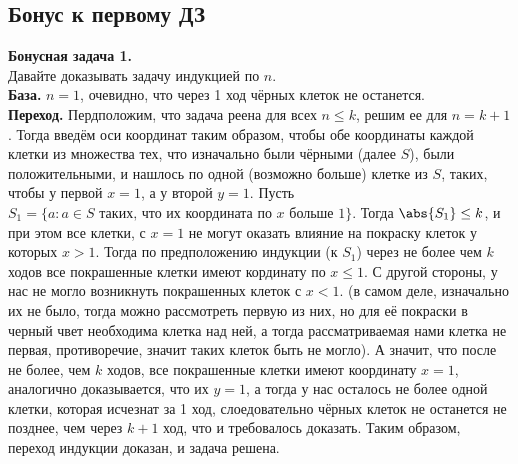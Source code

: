 \subsection{Бонус к первому ДЗ}


\textbf{Бонусная задача 1.}\\
Давайте доказывать задачу индукцией по $n$.\\
\textbf{База.} $n=1$, очевидно, что через 1 ход чёрных клеток не останется.\\
\textbf{Переход.} Пердположим, что задача реена для всех $n \leq k$, решим ее для $n=k+1$. Тогда введём оси координат таким образом, чтобы обе координаты каждой клетки из множества тех, что изначально были чёрными (далее $S$), были положительными, и нашлось по одной (возможно больше) клетке из $S$, таких, чтобы у первой $x=1$, а у второй $y=1$. Пусть $S_1 = \{a: a \in S \text{ таких, что их координата по $x$ больше 1}\}$. Тогда $\abs{S_1} \leq k$, и при этом все клетки, с $x = 1$ не могут оказать влияние на покраску клеток у которых $x > 1$. Тогда по предположению индукции (к $S_1$) через не более чем $k$ ходов все покрашенные клетки имеют кординату по $x \leq 1$. С другой стороны, у нас не могло возникнуть покрашенных клеток с $x < 1$. (в самом деле, изначально их не было, тогда можно рассмотреть первую из них, но для её покраски в черный чвет необходима клетка над ней, а тогда рассматриваемая нами клетка не первая, противоречие, значит таких клеток быть не могло). А значит, что после не более, чем $k$ ходов, все покрашенные клетки имеют координату $x = 1$, аналогично доказывается, что их $y = 1$, а тогда у нас осталось не более одной клетки, которая исчезнат за 1 ход, слоедовательно чёрных клеток не останется не позднее, чем через $k+1$ ход, что и требовалось доказать. Таким образом, переход индукции доказан, и задача решена.

